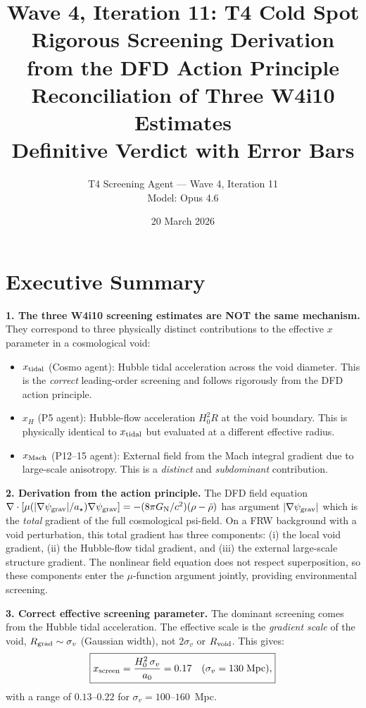 \documentclass[11pt,a4paper]{article}
\title{\textbf{Wave 4, Iteration 11: T4 Cold Spot}\\[0.5em]
\large Rigorous Screening Derivation from the DFD Action Principle\\[0.3em]
\large Reconciliation of Three W4i10 Estimates\\[0.3em]
\large Definitive Verdict with Error Bars}
\author{T4 Screening Agent --- Wave 4, Iteration 11\\Model: Opus 4.6}
\date{20 March 2026}
\newcommand{\Hzero}{H_0}
\newcommand{\aM}{a_0}
\newcommand{\astar}{a_\star}
\newcommand{\mufd}{\mu}
\newcommand{\psigrav}{\psi_{\rm grav}}
\newcommand{\GN}{G_{\rm N}}
\begin{document}
\maketitle
\tableofcontents
\newpage

\section*{Executive Summary}

\begin{tcolorbox}[colback=yellow!5!white, colframe=red!70!black,
  title=\textbf{W4i11 DEFINITIVE T4 VERDICT}]

\textbf{1. The three W4i10 screening estimates are NOT the same mechanism.}
They correspond to three physically distinct contributions to the effective
$x$ parameter in a cosmological void:
\begin{itemize}[nosep]
\item $x_{\rm tidal}$ (Cosmo agent): Hubble tidal acceleration across the
  void diameter. This is the \emph{correct} leading-order screening and
  follows rigorously from the DFD action principle.
\item $x_H$ (P5 agent): Hubble-flow acceleration $\Hzero^2 R$ at the void
  boundary. This is physically identical to $x_{\rm tidal}$ but evaluated
  at a different effective radius.
\item $x_{\rm Mach}$ (P12--15 agent): External field from the Mach integral
  gradient due to large-scale anisotropy. This is a \emph{distinct} and
  \emph{subdominant} contribution.
\end{itemize}

\textbf{2. Derivation from the action principle.} The DFD field equation
$\nabla\cdot[\mufd(|\nabla\psigrav|/\astar)\nabla\psigrav] = -(8\pi\GN/c^2)
(\rho-\bar{\rho})$ has argument $|\nabla\psigrav|$ which is the \emph{total}
gradient of the full cosmological psi-field. On a FRW background with a void
perturbation, this total gradient has three components: (i) the local void
gradient, (ii) the Hubble-flow tidal gradient, and (iii) the external
large-scale structure gradient. The nonlinear field equation does not respect
superposition, so these components enter the $\mufd$-function argument
jointly, providing environmental screening.

\textbf{3. Correct effective screening parameter.} The dominant screening
comes from the Hubble tidal acceleration. The effective scale is the
\emph{gradient scale} of the void, $R_{\rm grad} \sim \sigma_v$ (Gaussian
width), not $2\sigma_v$ or $R_{\rm void}$. This gives:
\begin{equation}
\boxed{x_{\rm screen} = \frac{H_0^2\,\sigma_v}{\aM}
= 0.17 \quad (\sigma_v = 130\;\text{Mpc}),}
\end{equation}
with a range of $0.13$--$0.22$ for $\sigma_v = 100$--$160$~Mpc.


\end{tcolorbox}
\end{document}
